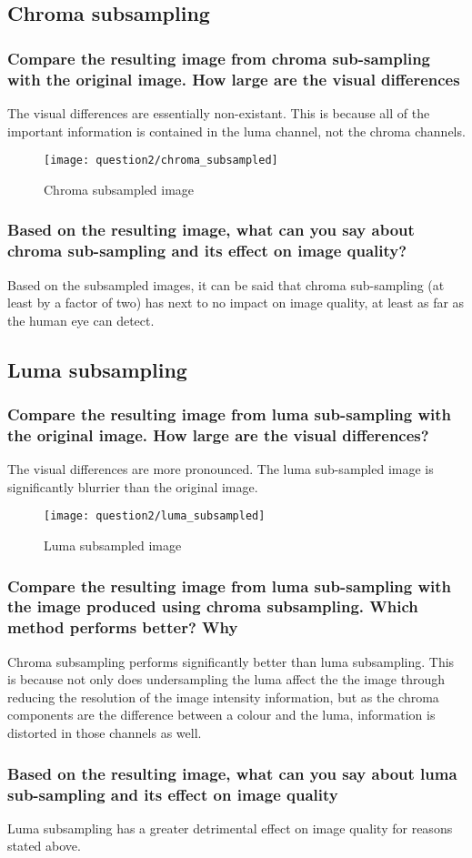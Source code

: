 \clearpage
\subsection{Chroma subsampling}
\subsubsection{Compare the resulting image from chroma sub-sampling with the original image. How large are the
visual differences}
The visual differences are essentially non-existant. This is because all of the important information is contained in the luma channel, not the chroma channels.

\begin{figure}[ht]
\centering	
	\texttt{[image: question2/chroma\_subsampled]}
	\caption{Chroma subsampled image}
\end{figure}

\subsubsection{Based on the resulting image, what can you say about chroma sub-sampling and its effect on image
quality?}
Based on the subsampled images, it can be said that chroma sub-sampling (at least by a factor of two) has next to no impact on image quality, at least as far as the human eye can detect.

\clearpage
\subsection{Luma subsampling}
\subsubsection{Compare the resulting image from luma sub-sampling with the original image. How large are the
visual differences?}
The visual differences are more pronounced. The luma sub-sampled image is significantly blurrier than the original image.



\begin{figure}[ht]
\centering		
	\texttt{[image: question2/luma\_subsampled]}
	\caption{Luma subsampled image}
\end{figure}

\subsubsection{ Compare the resulting image from luma sub-sampling with the image produced using chroma subsampling. Which method performs better? Why}
Chroma subsampling performs significantly better than luma subsampling. This is because not only does undersampling the luma affect the the image through reducing the resolution of the image intensity information, but as the chroma components are the difference between a colour and the luma, information is distorted in those channels as well.


\subsubsection{Based on the resulting image, what can you say about luma sub-sampling and its effect on image
quality}
Luma subsampling has a greater detrimental effect on image quality for reasons stated above.
